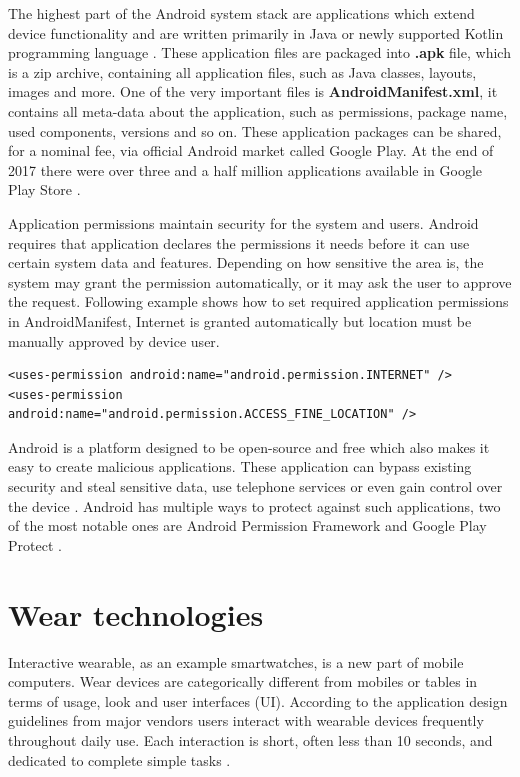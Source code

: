 The highest part of the Android system stack are applications which extend device functionality and are written primarily in Java or newly supported Kotlin programming language \cite{SoASTaD}. These application files are packaged into \textbf{.apk} file, which is a zip archive, containing all application files, such as Java classes, layouts, images and more. One of the very important files is \textbf{AndroidManifest.xml}, it contains all meta-data about the application, such as permissions, package name, used components, versions and so on. These application packages can be shared, for a nominal fee, via official Android market called Google Play. At the end of 2017 there were over three and a half million applications available in Google Play Store \cite{SoASTaD, NoAAiGPS, NoAA}.

Application permissions maintain security for the system and users. Android requires that application declares the permissions it needs before it can use certain system data and features. Depending on how sensitive the area is, the system may grant the permission automatically, or it may ask the user to approve the request. Following example shows how to set required application permissions in AndroidManifest, Internet is granted automatically but location must be manually approved by device user.

\begin{lstlisting}[caption=Application permission settings]
<uses-permission android:name="android.permission.INTERNET" />
<uses-permission android:name="android.permission.ACCESS_FINE_LOCATION" />
\end{lstlisting}

Android is a platform designed to be open-source and free which also makes it easy to create malicious applications. These application can bypass existing security and steal sensitive data, use telephone services or even gain control over the device \cite{ASIMPD}. Android has multiple ways to protect against such applications, two of the most notable ones are Android Permission Framework and Google Play Protect \cite{SoASTaD}.

\section{Wear technologies}\label{sec:WearTechnologies}
Interactive wearable, as an example smartwatches, is a new part of mobile computers. Wear devices are categorically different from mobiles or tables in terms of usage, look and user interfaces (UI). According to the application design guidelines from major vendors users interact with wearable devices frequently throughout daily use. Each interaction is short, often less than 10 seconds, and dedicated to complete simple tasks \cite{UtCoAWO}. 

